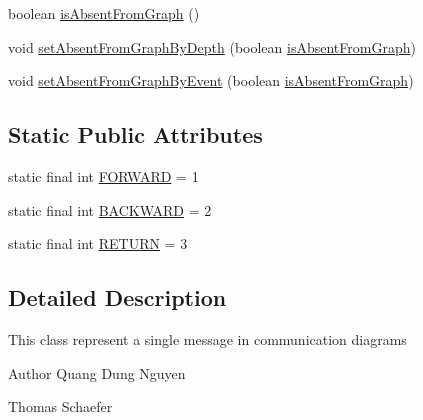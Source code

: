 \begin{DoxyCompactItemize}
boolean \hyperlink{classorg_1_1tzi_1_1use_1_1gui_1_1views_1_1diagrams_1_1behavior_1_1communicationdiagram_1_1_m_message_a77d98f8f5ebc49ad69c1879c1cff661a}{is\-Absent\-From\-Graph} ()
\item 
void \hyperlink{classorg_1_1tzi_1_1use_1_1gui_1_1views_1_1diagrams_1_1behavior_1_1communicationdiagram_1_1_m_message_ad7f236c3dd57d4166a9d41e8e6b024bb}{set\-Absent\-From\-Graph\-By\-Depth} (boolean \hyperlink{classorg_1_1tzi_1_1use_1_1gui_1_1views_1_1diagrams_1_1behavior_1_1communicationdiagram_1_1_m_message_a77d98f8f5ebc49ad69c1879c1cff661a}{is\-Absent\-From\-Graph})
\item 
void \hyperlink{classorg_1_1tzi_1_1use_1_1gui_1_1views_1_1diagrams_1_1behavior_1_1communicationdiagram_1_1_m_message_ac9fedab04da9a28895d34c0ade3a875f}{set\-Absent\-From\-Graph\-By\-Event} (boolean \hyperlink{classorg_1_1tzi_1_1use_1_1gui_1_1views_1_1diagrams_1_1behavior_1_1communicationdiagram_1_1_m_message_a77d98f8f5ebc49ad69c1879c1cff661a}{is\-Absent\-From\-Graph})
\end{DoxyCompactItemize}
\subsection*{Static Public Attributes}
\begin{DoxyCompactItemize}
\item 
static final int \hyperlink{classorg_1_1tzi_1_1use_1_1gui_1_1views_1_1diagrams_1_1behavior_1_1communicationdiagram_1_1_m_message_a663d85e45f5ec35f893f0207321cd190}{F\-O\-R\-W\-A\-R\-D} = 1
\item 
static final int \hyperlink{classorg_1_1tzi_1_1use_1_1gui_1_1views_1_1diagrams_1_1behavior_1_1communicationdiagram_1_1_m_message_a3614c5c29d5e1eb4a8d0b776c5ca6218}{B\-A\-C\-K\-W\-A\-R\-D} = 2
\item 
static final int \hyperlink{classorg_1_1tzi_1_1use_1_1gui_1_1views_1_1diagrams_1_1behavior_1_1communicationdiagram_1_1_m_message_a9822f19f12f199b169ad365bf0473e8f}{R\-E\-T\-U\-R\-N} = 3
\end{DoxyCompactItemize}


\subsection{Detailed Description}
This class represent a single message in communication diagrams

\begin{DoxyAuthor}{Author}
Quang Dung Nguyen 

Thomas Schaefer 
\end{DoxyAuthor}


